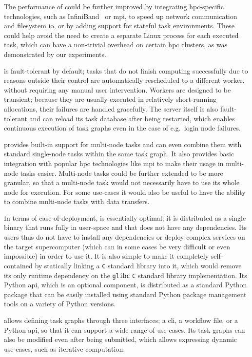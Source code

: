 \begin{description}[wide=0pt]
		The performance of \hyperqueue{} could be further improved by integrating
		\gls{hpc}-specific technologies, such as InfiniBand~\cite{infiniband} or
		\gls{mpi}, to speed up network communication and filesystem
		\gls{io}, or by adding support for stateful task environments. These could help
		avoid the need to create a separate Linux process for each executed task, which can have a
		non-trivial overhead on certain \gls{hpc} clusters, as was demonstrated by our
		experiments.
	\item[Fault tolerance] \hyperqueue{} is fault-tolerant by default; tasks that do not
		finish computing successfully due to reasons outside their control are automatically rescheduled to
		a different worker, without requiring any manual user intervention. Workers are designed to be
		transient; because they are usually executed in relatively short-running allocations, their
		failures are handled gracefully. The server itself is also fault-tolerant and can reload its task
		database after being restarted, which enables continuous execution of task graphs even in the case
		of e.g.\ login node failures.
	\item[Multi-node tasks] \hyperqueue{} provides built-in support for multi-node tasks and
		can even combine them with standard single-node tasks within the same task graph. It also provides
		basic integration with popular \gls{hpc} technologies like
		\gls{mpi} to make their usage in multi-node tasks easier. Multi-node tasks could
		be further extended to be more granular, so that a multi-node task would not necessarily have to
		use its whole node for execution. For some use-cases it would also be useful to have the ability to
		combine multi-node tasks with data transfers.
	\item[Deployment] In terms of ease-of-deployment, \hyperqueue{} is essentially optimal; it is
		distributed as a single binary that runs fully in user-space and that does not have any
		dependencies. Its users thus do not have to install any dependencies or deploy complex services on
		the target supercomputer (which can in some cases be very difficult or even impossible) in order to
		use it. It is also simple to make it completely self-contained by statically linking a
		\texttt{C} standard library into it, which would remove its only runtime dependency
		on the \texttt{glibc} \texttt{C} standard library implementation. Its
		Python \gls{api}, which is an optional component, is distributed as a standard
		Python package that can be easily installed using standard Python package management tools on a
		variety of Python versions.
	\item[Programming model] \hyperqueue{} allows defining task graphs through three
		interfaces; a \gls{cli}, a workflow file, or a Python \gls{api},
		so that it can support a wide range of use-cases. Its task graphs can also be modified even after
		being submitted, which allows expressing dynamic use-cases, such as iterative computation.


\end{description}
